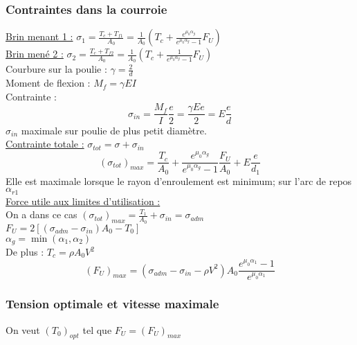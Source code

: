 \documentclass[../main.tex]{subfiles}
\begin{document}
\subsubsection{Contraintes dans la courroie}
\underline{Brin menant 1 :} $\sigma_1 = \frac{T_c+T_{f1}}{A_0} = \frac{1}{A_0}(T_c + \frac{e^{\mu_0 \alpha_g}}{e^{\mu_0 \alpha_g}-1}F_U)$\\

\underline{Brin mené 2 :} $\sigma_2 = \frac{T_c+T_{f2}}{A_0} = \frac{1}{A_0}(T_c + \frac{1}{e^{\mu_0 \alpha_g}-1}F_U)$\\

Courbure sur la poulie : $\gamma = \frac{2}{d}$\\
Moment de flexion : $M_f = \gamma EI$\\
Contrainte : \begin{equation}
    \sigma_{in} = \frac{M_f}{I} \frac{e}{2} = \frac{\gamma E e}{2} = E \frac{e}{d}
\end{equation}
\color{gray}$\sigma_{in}$ maximale sur poulie de plus petit diamètre.\color{black}\\

\underline{Contrainte totale :} $\sigma_{tot} = \sigma + \sigma_{in}$\\
\begin{equation}
    (\sigma_{tot})_{max} = \frac{T_c}{A_0} + \frac{e^{\mu_0 \alpha_g}}{e^{\mu_0 \alpha_g}-1} \frac{F_U}{A_0} + E \frac{e}{d_1}
\end{equation}
Elle est maximale lorsque le rayon d'enroulement est minimum; sur l'arc de repos $\alpha_{r1}$\\

\quad \underline{Force utile aux limites d'utilisation :}\\
On a dans ce cas $(\sigma_{tot})_{max} = \frac{T_1}{A_0} + \sigma_{in} = \sigma_{adm}$\\
$F_U = 2[(\sigma_{adm}-\sigma_{in})A_0-T_0]$\\
$\alpha_g = \min(\alpha_1, \alpha_2)$\\
De plus : $T_c = \rho A_0 V^2$\\

\begin{equation}
    (F_U)_{max} = (\sigma_{adm}-\sigma_{in} - \rho V^2) A_0 \frac{e^{\mu_0 \alpha_1}-1}{e^{\mu_0 \alpha_1}}
\end{equation}

\subsubsection{Tension optimale et vitesse maximale}
On veut $(T_0)_{opt}$ tel que $F_U = (F_U)_{max}$\\
\end{document}
